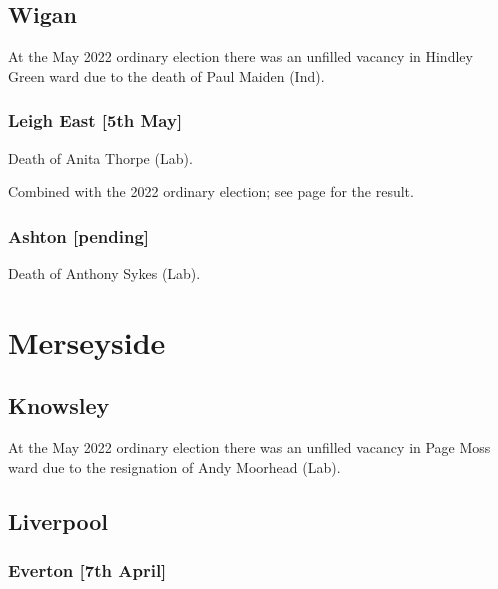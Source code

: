\documentclass[a4paper,openany]{book}
\begin{document}
\begin{resultsiii}
\subsection*{Wigan}

At the May 2022 ordinary election there was an unfilled vacancy in Hindley Green ward due to the death of Paul Maiden (Ind).%

\subsubsection*{Leigh East \hspace*{\fill}\nolinebreak[1]%
	\enspace\hspace*{\fill}
	[5th May]}


Death of Anita Thorpe (Lab).

Combined with the 2022 ordinary election; see page \pageref{WiganLeighEast} for the result.

\subsubsection*{Ashton \hspace*{\fill}\nolinebreak[1]%
	\enspace\hspace*{\fill}
	[pending]}


Death of Anthony Sykes (Lab).

\section{Merseyside}

\subsection*{Knowsley}

At the May 2022 ordinary election there was an unfilled vacancy in Page Moss ward due to the resignation of Andy Moorhead (Lab).%

\subsection*{Liverpool}

\subsubsection*{Everton \hspace*{\fill}\nolinebreak[1]%
	\enspace\hspace*{\fill}
	[7th April]}


\end{resultsiii}
\end{document}
